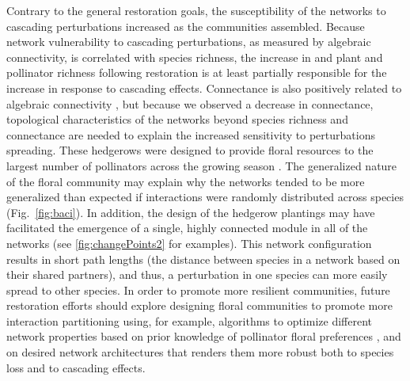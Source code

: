\documentclass[12pt]{article}
\begin{document}
Contrary to the general restoration goals, the susceptibility of the
networks to cascading perturbations increased as the communities
assembled. Because network vulnerability to cascading perturbations,
as measured by algebraic connectivity, is correlated with species
richness, the increase in and plant and pollinator richness following
restoration is at least partially responsible for the increase in
response to cascading effects. Connectance is also positively related
to algebraic connectivity \citep{gibert2013spatial}, but because we
observed a decrease in connectance, topological characteristics of the
networks beyond species richness and connectance are needed to explain
the increased sensitivity to perturbations spreading. These hedgerows
were designed to provide floral resources to the largest number of
pollinators across the growing season \citep{menz-2010-4}. The
generalized nature of the floral community may explain why the
networks tended to be more generalized than expected if interactions
were randomly distributed across species (Fig.~\ref{fig:baci}). In
addition, the design of the hedgerow plantings may have facilitated
the emergence of a single, highly connected module in all of the
networks (see \ref{fig:changePoints2} for examples). This network
configuration results in short path lengths (the distance between
species in a network based on their shared partners), and thus, a
perturbation in one species can more easily spread to other
species. In order to promote more resilient communities, future
restoration efforts should explore designing floral communities to
promote more interaction partitioning using, for example, algorithms
to optimize different network properties based on prior knowledge of
pollinator floral preferences \citep{mgonigle2016tool}, and on desired
network architectures that renders them more robust both to species
loss and to cascading effects.



\end{document}
